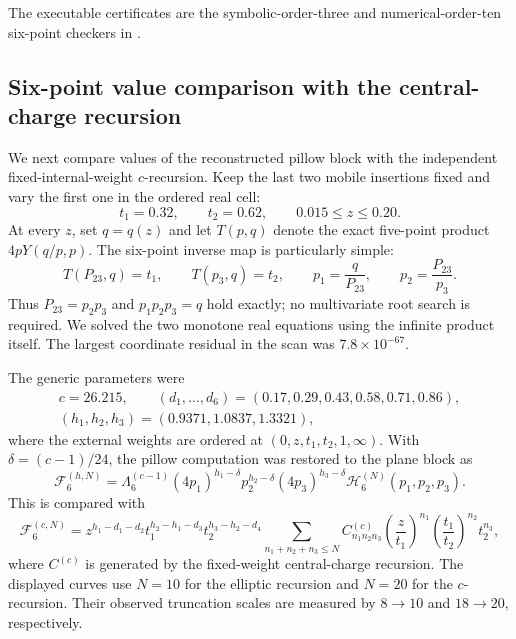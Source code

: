 \documentclass[11pt]{article}
\newcommand{\cF}{\mathcal F}
\newcommand{\cH}{\mathcal H}
\begin{document}
The executable certificates are the symbolic-order-three and
numerical-order-ten six-point checkers in
.

\subsection{Six-point value comparison with the central-charge recursion}

We next compare values of the reconstructed pillow block with the
independent fixed-internal-weight $c$-recursion.  Keep the last two mobile
insertions fixed and vary the first one in the ordered real cell:
\begin{equation}
 t_1=0.32,\qquad t_2=0.62,\qquad 0.015\leq z\leq0.20.
 \label{eq:sixpoint-value-moduli}
\end{equation}
At every $z$, set $q=q(z)$ and let $T(p,q)$ denote the exact five-point
product $4pY(q/p,p)$.  The six-point inverse map is particularly simple:
\begin{equation}
 \boxed{
 T(P_{23},q)=t_1,\qquad T(p_3,q)=t_2,\qquad
 p_1=\frac{q}{P_{23}},\qquad p_2=\frac{P_{23}}{p_3}.}
 \label{eq:sixpoint-value-inverse-map}
\end{equation}
Thus $P_{23}=p_2p_3$ and $p_1p_2p_3=q$ hold exactly; no multivariate root
search is required.  We solved the two monotone real equations using the
infinite product itself.  The largest coordinate residual in the scan was
$7.8\times10^{-67}$.

The generic parameters were
\begin{equation}
 \begin{gathered}
 c=26.215,\qquad
 (d_1,\ldots,d_6)=(0.17,0.29,0.43,0.58,0.71,0.86),\\
 (h_1,h_2,h_3)=(0.9371,1.0837,1.3321),
 \end{gathered}
 \label{eq:sixpoint-value-weights}
\end{equation}
where the external weights are ordered at
$(0,z,t_1,t_2,1,\infty)$.  With
$\delta=(c-1)/24$, the pillow computation was restored to the plane block
as
\begin{equation}
 \cF^{(h,N)}_6=
 \Lambda_6^{(c-1)}
 (4p_1)^{h_1-\delta}p_2^{h_2-\delta}(4p_3)^{h_3-\delta}
 \cH_6^{(N)}(p_1,p_2,p_3).
 \label{eq:sixpoint-value-pillow-reconstruction}
\end{equation}
This is compared with
\begin{equation}
 \cF^{(c,N)}_6=
 z^{h_1-d_1-d_2}t_1^{h_2-h_1-d_3}t_2^{h_3-h_2-d_4}
 \sum_{n_1+n_2+n_3\leq N}
 C^{(c)}_{n_1n_2n_3}
 \left(\frac{z}{t_1}\right)^{n_1}
 \left(\frac{t_1}{t_2}\right)^{n_2}t_2^{n_3},
 \label{eq:sixpoint-value-c-recursion}
\end{equation}
where $C^{(c)}$ is generated by the fixed-weight central-charge recursion.
The displayed curves use $N=10$ for the elliptic recursion and $N=20$ for
the $c$-recursion.  Their observed truncation scales are measured by
$8\to10$ and $18\to20$, respectively.
\end{document}
